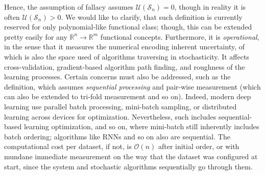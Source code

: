 Hence, the assumption of fallacy assumes $\mathcal{U}(\mathcal{S}_{n})=0$, though in reality it is often $\mathcal{U}(\mathcal{S}_{n})>0$. We would like to clarify, that such definition is currently reserved for only polynomial-like functional class; though, this can be extended pretty easily for any $\mathbb{R}^{n}\to\mathbb{R}^{m}$ functional concepts. Furthermore, it is \textit{operational}, in the sense that it measures the numerical encoding inherent uncertainty, of which is also the space used of algorithms traversing in stochasticity. It affects cross-validation, gradient-based algorithm path finding, and roughness of the learning processes. Certain concerns must also be addressed, such as the definition, which assumes \textit{sequential processing} and pair-wise measurement (which can also be extended to tri-fold measurement and so on). Indeed, modern deep learning use parallel batch processing, mini-batch sampling, or distributed learning across devices for optimization. Nevertheless, such includes sequential-based learning optimization, and so on, where mini-batch still inherently includes batch ordering; algorithms like RNNs and so on also are sequential. The computational cost per dataset, if not, is $\mathcal{O}(n)$ after initial order, or with mundane immediate measurement on the way that the dataset was configured at start, since the system and stochastic algorithms sequentially go through them.

